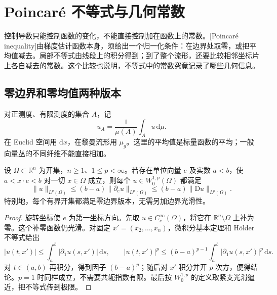 
% 
% 

\section{Poincaré 不等式与几何常数}
\label{g3:sec:1104}

控制导数只能控制函数的变化，不能直接控制加在函数上的常数。[Poincaré inequality]由梯度估计函数本身，须给出一个归一化条件：在边界处取零，或把平均值减去。局部不等式由线段上的积分得到；到了整个流形，还要比较相邻坐标片上各自减去的常数。这个比较也说明，不等式中的常数究竟记录了哪些几何信息。

\subsection{零边界和零均值两种版本}
\label{g3:subsec:1104:01}
对正测度、有限测度的集合 \(A\)，记
\[
	u_A=\frac1{\mu(A)}\int_Au\,\mathrm d\mu.
\]
在 Euclid 空间用 \(\mathrm dx\)，在黎曼流形用 \(\mu_g\)。这里的平均值是标量函数的平均；一般向量丛的不同纤维不能直接相加。

\begin{theorem}\label{g3:thm:poincare-zero-boundary}
	设 \(\Omega\subset\mathbb R^n\) 为开集，\(n\ge1\)、\(1\le p<\infty\)。若存在单位向量 \(e\) 及实数 \(a<b\)，使 \(a<x\cdot e<b\) 对一切 \(x\in\Omega\) 成立，则每个 \(u\in W^{1,p}_0(\Omega)\) 都满足
	\begin{equation}\label{g3:eq:poincare-zero-boundary}
		\|u\|_{L^p(\Omega)}\le(b-a)\|\partial_eu\|_{L^p(\Omega)}
		\le(b-a)\|\mathrm D u\|_{L^p(\Omega)}.
	\end{equation}
	特别地，每个有界开集都满足零边界版本，无需另加边界光滑性。
\end{theorem}
\begin{proof}
	旋转坐标使 \(e\) 为第一坐标方向。先取 \(u\in C_c^\infty(\Omega)\)，将它在 \(\mathbb R^n\setminus\Omega\) 上补为零。这个补零函数仍光滑。对固定 \(x'=(x_2,\ldots,x_n)\)，微积分基本定理和 Hölder 不等式给出
	\[
		|u(t,x')|\le\int_a^b|\partial_1u(s,x')|\,\mathrm ds,
		\qquad
		|u(t,x')|^p\le(b-a)^{p-1}\int_a^b|\partial_1u(s,x')|^p\,\mathrm ds.
	\]
	对 \(t\in(a,b)\) 再积分，得到因子 \((b-a)^p\)；随后对 \(x'\) 积分并开 \(p\) 次方，便得结论。\(p=1\) 时同样成立，不需要共轭指数有限。最后按 \(W^{1,p}_0\) 的定义取紧支光滑逼近，把不等式传到极限。
\end{proof}


